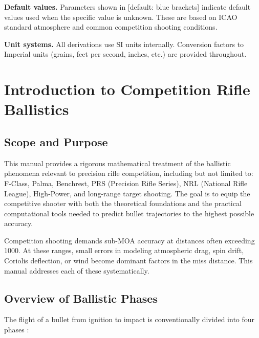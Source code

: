 \documentclass[11pt,twoside,openright]{report}
\newcommand{\default}[1]{\;\textrm{\textcolor{blue!60!black}{[default: #1]}}}
\begin{document}
\textbf{Default values.} Parameters shown in \default{blue brackets} indicate default values used when the specific value is unknown. These are based on ICAO standard atmosphere and common competition shooting conditions.

\textbf{Unit systems.} All derivations use SI units internally. Conversion factors to Imperial units (grains, feet per second, inches, etc.) are provided throughout.

\newpage
{}
\setcounter{page}{1}

\chapter{Introduction to Competition Rifle Ballistics}
\label{ch:intro}

\section{Scope and Purpose}

This manual provides a rigorous mathematical treatment of the ballistic phenomena relevant to precision rifle competition, including but not limited to: F-Class, Palma, Benchrest, PRS (Precision Rifle Series), NRL (National Rifle League), High-Power, and long-range target shooting. The goal is to equip the competitive shooter with both the theoretical foundations and the practical computational tools needed to predict bullet trajectories to the highest possible accuracy.

Competition shooting demands sub-MOA accuracy at distances often exceeding \SI{1000}{\yard}. At these ranges, small errors in modeling atmospheric drag, spin drift, Coriolis deflection, or wind become dominant factors in the miss distance. This manual addresses each of these systematically.

\section{Overview of Ballistic Phases}

The flight of a bullet from ignition to impact is conventionally divided into four phases \citep{mccoy1999modern}:
\end{document}
